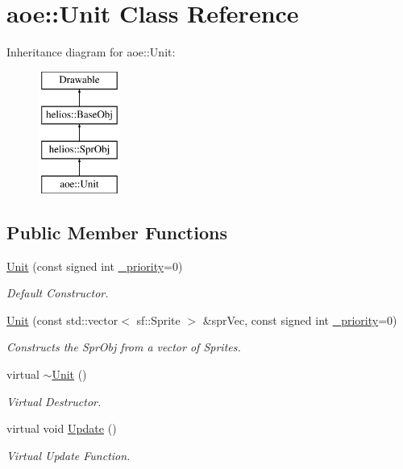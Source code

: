 \hypertarget{classaoe_1_1_unit}{}\section{aoe\+:\+:Unit Class Reference}
\label{classaoe_1_1_unit}
Inheritance diagram for aoe\+:\+:Unit\+:\begin{figure}[H]
\begin{center}
\leavevmode
\includegraphics[height=4.000000cm]{classaoe_1_1_unit}
\end{center}
\end{figure}
\subsection*{Public Member Functions}
\begin{DoxyCompactItemize}
\item 
\hyperlink{classaoe_1_1_unit_a0e11a0e05d4014fc8a954ddddfa910cd}{Unit} (const signed int \hyperlink{classhelios_1_1_base_obj_aa770e0799b9c82837fd40fbe80eb15e3}{\+\_\+priority}=0)
\begin{DoxyCompactList}\small\item\em Default Constructor. \end{DoxyCompactList}\item 
\hyperlink{classaoe_1_1_unit_ae9a5454a6bf7ef440ddd9838361fc098}{Unit} (const std\+::vector$<$ sf\+::\+Sprite $>$ \&spr\+Vec, const signed int \hyperlink{classhelios_1_1_base_obj_aa770e0799b9c82837fd40fbe80eb15e3}{\+\_\+priority}=0)
\begin{DoxyCompactList}\small\item\em Constructs the Spr\+Obj from a vector of Sprites. \end{DoxyCompactList}\item 
\hypertarget{classaoe_1_1_unit_a4190e3b96ce7d0df4daccdae7b542490}{}virtual \hyperlink{classaoe_1_1_unit_a4190e3b96ce7d0df4daccdae7b542490}{$\sim$\+Unit} ()\label{classaoe_1_1_unit_a4190e3b96ce7d0df4daccdae7b542490}

\begin{DoxyCompactList}\small\item\em Virtual Destructor. \end{DoxyCompactList}\item 
virtual void \hyperlink{classaoe_1_1_unit_af529a5f8a4caa37fcd904077c032e664}{Update} ()
\begin{DoxyCompactList}\small\item\em Virtual Update Function. \end{DoxyCompactList}\end{DoxyCompactItemize}
